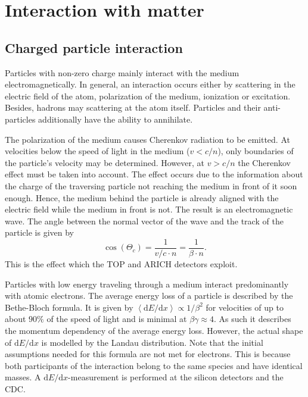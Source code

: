 \section{Interaction with matter}
\label{sec:interaction_with_matter}

\subsection{Charged particle interaction}
\label{sec:interaction_with_matter}

Particles with non-zero charge mainly interact with the medium electromagnetically. In general, an interaction occurs either by scattering in the electric field of the atom, polarization of the medium, ionization or excitation. Besides, hadrons may scattering at the atom itself. Particles and their anti-particles additionally have the ability to annihilate.

The polarization of the medium causes Cherenkov radiation to be emitted. At velocities below the speed of light in the medium ($v < c/n$), only boundaries of the particle's velocity may be determined. However, at $v > c/n$ the Cherenkov effect must be taken into account. The effect occurs due to the information about the charge of the traversing particle not reaching the medium in front of it soon enough. Hence, the medium behind the particle is already aligned with the electric field while the medium in front is not. The result is an electromagnetic wave. The angle between the normal vector of the wave and the track of the particle is given by
\begin{equation}
	\cos(\Theta_{c}) = \frac{1}{v/c \cdot n} = \frac{1}{\beta \cdot n}
	\mathrm{.}
\end{equation}
This is the effect which the TOP and ARICH detectors exploit.

Particles with low energy traveling through a medium interact predominantly with atomic electrons. The average energy loss of a particle is described by the Bethe-Bloch formula. It is given by $\left< \mathrm{d}E/\mathrm{d}x \right> \propto 1/{\beta^2}$ for velocities of up to about $90\%$ of the speed of light and is minimal at $\beta \gamma \approx 4$. As such it describes the momentum dependency of the average energy loss. However, the actual shape of $\mathrm{d}E/\mathrm{d}x$ is modelled by the Landau distribution. Note that the initial assumptions needed for this formula are not met for electrons. This is because both participants of the interaction belong to the same species and have identical masses.
A $\mathrm{d}E/\mathrm{d}x$-measurement is performed at the silicon detectors and the CDC.

